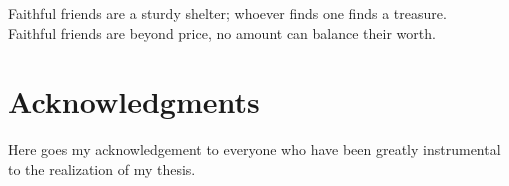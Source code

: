 

\normalsize

\makeatletter
\renewcommand{\@makechapterhead}[1]{%
  \chapterheadstartvskip%
  {\size@chapter{\sectfont\raggedleft
    {%
    \vspace{2em}
      \ifnum \c@secnumdepth >\m@ne%
        \if@mainmatter\thechapter\else\phantom{\thechapter}%
      \fi\else\phantom{\thechapter}\fi
      \par\nobreak}%
    {\raggedleft\advance\leftmargin10em\interlinepenalty\@M #1\par}}
  \nobreak\chapterheadendvskip}}
\makeatother

\begin{savequote}[85mm]
Faithful friends are a sturdy shelter; whoever finds one finds a treasure. \\
Faithful friends are beyond price, no amount can balance their worth.
\end{savequote}

\chapter*{Acknowledgments}

Here goes my acknowledgement to everyone who have been greatly instrumental to the realization of my thesis.